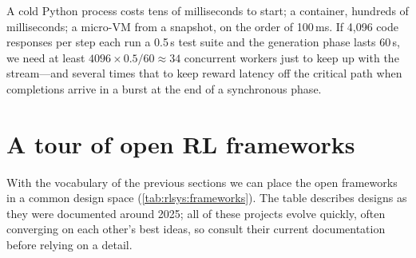 \begin{napkinmath}
A cold Python process costs tens of milliseconds to start; a container, hundreds of
milliseconds; a micro-VM from a snapshot, on the order of 100\,ms. If 4{,}096 code responses
per step each run a 0.5\,s test suite and the generation phase lasts 60\,s, we need at least
$4096\times 0.5/60\approx 34$ concurrent workers just to keep up with the stream---and several
times that to keep reward latency off the critical path when completions arrive in a burst at
the end of a synchronous phase.
\end{napkinmath}

\section{A tour of open RL frameworks}\label{sec:rlsys:frameworks}

With the vocabulary of the previous sections we can place the open frameworks in a common
design space (\cref{tab:rlsys:frameworks}). The table describes designs as they were
documented around 2025; all of these projects evolve quickly, often converging on each
other's best ideas, so consult their current documentation before relying on a detail.

